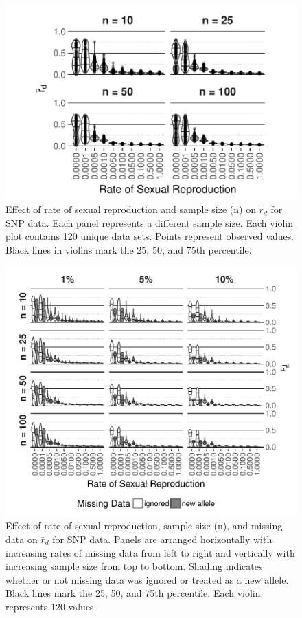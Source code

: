 \documentclass[]{article}
\theoremstyle{definition}
\theoremstyle{definition}
\theoremstyle{definition}
\theoremstyle{remark}
\begin{document}
\begin{figure}
\centering
\includegraphics[width=1.00000\textwidth]{figure/genomic_rd.pdf}
\caption{Effect of rate of sexual reproduction and sample size (n) on
\(\bar{r}_d\) for SNP data. Each panel represents a different sample
size. Each violin plot contains 120 unique data sets. Points represent
observed values. Black lines in violins mark the 25, 50, and 75th
percentile.}\label{fig:sim5}
\end{figure}

\begin{figure}
\centering
\includegraphics[width=1.00000\textwidth]{figure/genomic_missing.pdf}
\caption{Effect of rate of sexual reproduction, sample size (n), and
missing data on \(\bar{r}_d\) for SNP data. Panels are arranged
horizontally with increasing rates of missing data from left to right
and vertically with increasing sample size from top to bottom. Shading
indicates whether or not missing data was ignored or treated as a new
allele. Black lines mark the 25, 50, and 75th percentile. Each violin
represents 120 values.}\label{fig:simmisssnp}
\end{figure}
\end{document}
